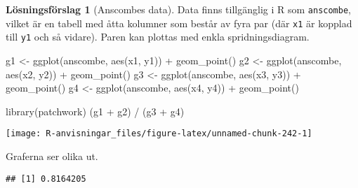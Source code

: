 \documentclass[
]{book}
\newenvironment{Shaded}{\begin{snugshade}}{\end{snugshade}}
\newcommand{\FunctionTok}[1]{\textcolor[rgb]{0.00,0.00,0.00}{#1}}
\newcommand{\NormalTok}[1]{#1}
\newcommand{\OtherTok}[1]{\textcolor[rgb]{0.56,0.35,0.01}{#1}}
\newcommand{\SpecialCharTok}[1]{\textcolor[rgb]{0.00,0.00,0.00}{#1}}
\theoremstyle{definition}
\theoremstyle{definition}
\theoremstyle{definition}
\theoremstyle{definition}
\newtheorem{hypothesis}{Lösningsförslag}[chapter]
\theoremstyle{remark}
\begin{document}
\begin{hypothesis}[Anscombes data]
Data finns tillgänglig i R som \texttt{anscombe}, vilket är en tabell med åtta kolumner som består av fyra par (där \texttt{x1} är kopplad till \texttt{y1} och så vidare). Paren kan plottas med enkla spridningsdiagram.

\begin{Shaded}
\begin{Highlighting}[]
\NormalTok{g1 }\OtherTok{\textless{}{-}} \FunctionTok{ggplot}\NormalTok{(anscombe, }\FunctionTok{aes}\NormalTok{(x1, y1)) }\SpecialCharTok{+} \FunctionTok{geom\_point}\NormalTok{()}
\NormalTok{g2 }\OtherTok{\textless{}{-}} \FunctionTok{ggplot}\NormalTok{(anscombe, }\FunctionTok{aes}\NormalTok{(x2, y2)) }\SpecialCharTok{+} \FunctionTok{geom\_point}\NormalTok{()}
\NormalTok{g3 }\OtherTok{\textless{}{-}} \FunctionTok{ggplot}\NormalTok{(anscombe, }\FunctionTok{aes}\NormalTok{(x3, y3)) }\SpecialCharTok{+} \FunctionTok{geom\_point}\NormalTok{()}
\NormalTok{g4 }\OtherTok{\textless{}{-}} \FunctionTok{ggplot}\NormalTok{(anscombe, }\FunctionTok{aes}\NormalTok{(x4, y4)) }\SpecialCharTok{+} \FunctionTok{geom\_point}\NormalTok{()}

\FunctionTok{library}\NormalTok{(patchwork)}
\NormalTok{(g1 }\SpecialCharTok{+}\NormalTok{ g2) }\SpecialCharTok{/}\NormalTok{ (g3 }\SpecialCharTok{+}\NormalTok{ g4)}
\end{Highlighting}
\end{Shaded}

\begin{center}\texttt{[image: R-anvisningar\_files/figure-latex/unnamed-chunk-242-1]} \end{center}

Graferna ser olika ut.

\begin{Shaded}
\end{Shaded}

\begin{verbatim}
## [1] 0.8164205
\end{verbatim}

\begin{Shaded}
\end{Shaded}


\end{hypothesis}
\end{document}
